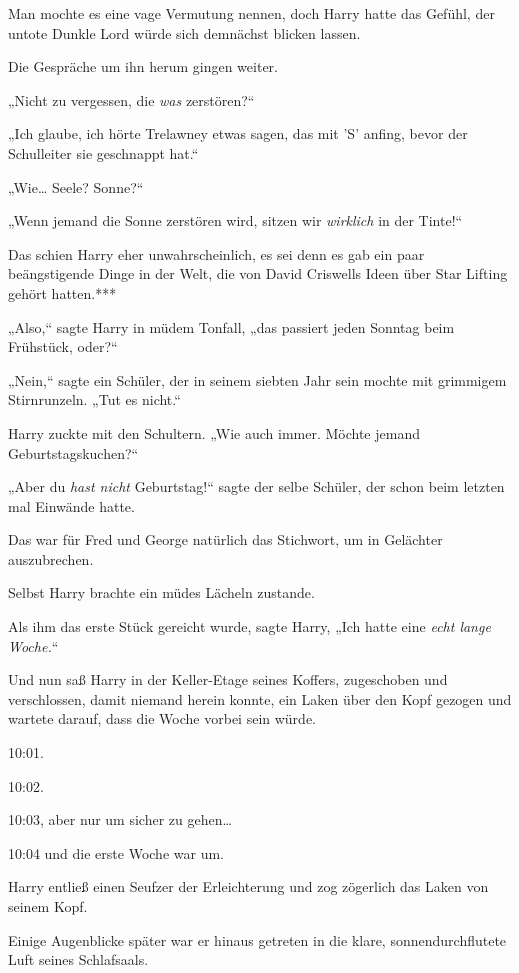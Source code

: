 {Man mochte es eine vage Vermutung nennen, doch Harry hatte das Gefühl, der untote Dunkle Lord würde sich demnächst blicken lassen.

Die Gespräche um ihn herum gingen weiter.

„Nicht zu vergessen, die \emph{was} zerstören?“

„Ich glaube, ich hörte Trelawney etwas sagen, das mit 'S' anfing, bevor der Schulleiter sie geschnappt hat.“

„Wie… Seele? Sonne?“

„Wenn jemand die Sonne zerstören wird, sitzen wir \emph{wirklich} in der Tinte!“

Das schien Harry eher unwahrscheinlich, es sei denn es gab ein paar beängstigende Dinge in der Welt, die von David Criswells Ideen über Star Lifting gehört hatten.***

„Also,“ sagte Harry in müdem Tonfall, „das passiert jeden Sonntag beim Frühstück, oder?“

„Nein,“ sagte ein Schüler, der in seinem siebten Jahr sein mochte mit grimmigem Stirnrunzeln. „Tut es nicht.“

Harry zuckte mit den Schultern. „Wie auch immer. Möchte jemand Geburtstagskuchen?“

„Aber du \emph{hast nicht} Geburtstag!“ sagte der selbe Schüler, der schon beim letzten mal Einwände hatte.

Das war für Fred und George natürlich das Stichwort, um in Gelächter auszubrechen.

Selbst Harry brachte ein müdes Lächeln zustande.

Als ihm das erste Stück gereicht wurde, sagte Harry, „Ich hatte eine \emph{echt lange Woche.}“

\later

Und nun saß Harry in der Keller-Etage seines Koffers, zugeschoben und verschlossen, damit niemand herein konnte, ein Laken über den Kopf gezogen und wartete darauf, dass die Woche vorbei sein würde.

10:01.

10:02.

10:03, aber nur um sicher zu gehen…

10:04 und die erste Woche war um.

Harry entließ einen Seufzer der Erleichterung und zog zögerlich das Laken von seinem Kopf.

Einige Augenblicke später war er hinaus getreten in die klare, sonnendurchflutete Luft seines Schlafsaals.

}
